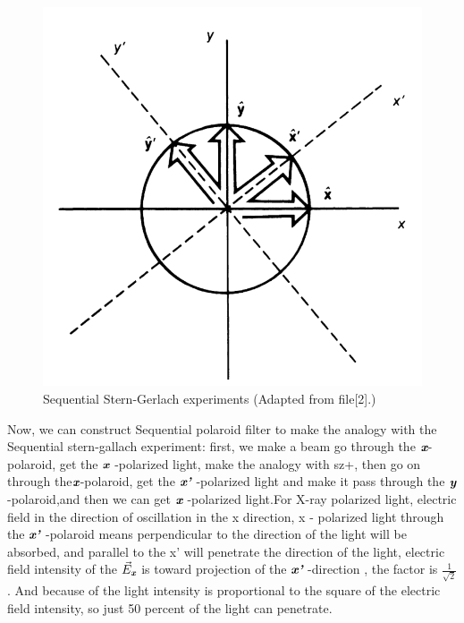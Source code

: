 \documentclass[a4paper]{article}
\def\mathbi#1{\textbf{\em #1}}
\begin{document}
\begin{figure}[htbp!] \label{figure}
\centering %
    \includegraphics[width=1.0\linewidth]{66.JPG}
    
    \caption{Sequential  Stern-Gerlach  experiments (Adapted from file[2].)}
\end{figure}
Now, we can construct Sequential polaroid filter to make the analogy with the Sequential stern-gallach experiment: first, we make a beam go through the $\mathbi{x}$-polaroid, get the $\mathbi{x}$ -polarized light, make the analogy with sz+, then go on through the$\mathbi{x}$-polaroid, get the $\mathbi{x'}$ -polarized light and make it pass through the $\mathbi{y}$-polaroid,and then we can get $\mathbi{x}$ -polarized light.For X-ray polarized light, electric field in the direction of oscillation in the x direction, x - polarized light through the  $\mathbi{x'}$ -polaroid means perpendicular to the direction of the light will be absorbed, and parallel to the x' will penetrate the direction of the light, electric field intensity of the \textbf{$\vec{E}_{\mathbi{x}}$} is toward projection of the $\mathbi{x'}$ -direction , the factor is $\frac{1}{\sqrt{2}}$. And because of the light intensity is proportional to the square of the electric field intensity, so just 50 percent of the light can penetrate\cite{sakurai1995modern}.
\end{document}
